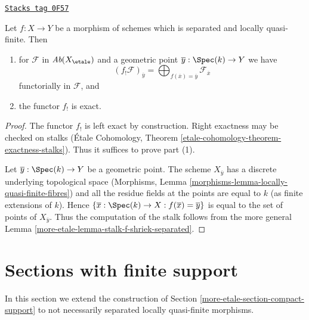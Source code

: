 \begin{lemma}
\label{more-etale-lemma-lqf-f-shriek-separated-colimits}
\href{https://stacks.math.columbia.edu/tag/0F57}{\texttt{Stacks tag 0F57}}

Let $f : X \to Y$ be a morphism of schemes which is separated and
locally quasi-finite. Then
\begin{enumerate}
\item for $\mathcal{F}$ in $\textit{Ab}(X_\etale)$ and a geometric
point $\overline{y} : \Spec(k) \to Y$ we have
$$
(f_!\mathcal{F})_{\overline{y}} =
\bigoplus\nolimits_{f(\overline{x}) = \overline{y}} \mathcal{F}_{\overline{x}}
$$
functorially in $\mathcal{F}$, and
\item the functor $f_!$ is exact.
\end{enumerate}
\end{lemma}

\begin{proof}
The functor $f_!$ is left exact by construction. Right exactness may
be checked on stalks
(\'Etale Cohomology, Theorem \ref{etale-cohomology-theorem-exactness-stalks}).
Thus it suffices to prove part (1).

\medskip\noindent
Let $\overline{y} : \Spec(k) \to Y$ be a geometric point.
The scheme $X_{\overline{y}}$ has a discrete underlying
topological space
(Morphisms, Lemma \ref{morphisms-lemma-locally-quasi-finite-fibres})
and all the residue fields at the points are equal to $k$
(as finite extensions of $k$). Hence
$\{\overline{x} : \Spec(k) \to X : f(\overline{x}) = \overline{y}\}$
is equal to the set of points of $X_{\overline{y}}$.
Thus the computation of the stalk follows from the more general
Lemma \ref{more-etale-lemma-stalk-f-shriek-separated}.
\end{proof}

\section{Sections with finite support}
\label{more-etale-section-finite-support}
In this section we extend the construction of
Section \ref{more-etale-section-compact-support} to not necessarily
separated locally quasi-finite morphisms.

